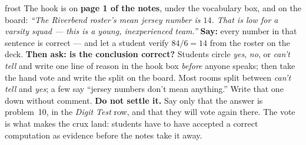 \documentclass[10pt]{article}
\begin{document}
\boxguard
\begin{skillbox}{frost}
The hook is on \textbf{page 1 of the notes}, under the vocabulary box, and on the board:
\textit{``The Riverbend roster's mean jersey number is $14$. That is low for a varsity squad
--- this is a young, inexperienced team.''} \textbf{Say:} every number in that sentence is
correct --- and let a student verify $84/6 = 14$ from the roster on the deck. \textbf{Then
ask: is the conclusion correct?} Students circle \emph{yes}, \emph{no}, or \emph{can't
tell} and write one line of reason in the hook box \emph{before} anyone speaks; then take the
hand vote and write the split on the board. Most rooms split between \emph{can't tell} and
\emph{yes}; a few say ``jersey numbers don't mean anything.'' Write that one down without
comment.
\textbf{Do not settle it.} Say only that the answer is problem~10, in the \emph{Digit Test}
row, and that they will vote again there. The vote is what makes the crux land: students
have to have accepted a correct computation as evidence before the notes take it away.
\end{skillbox}
\end{document}
